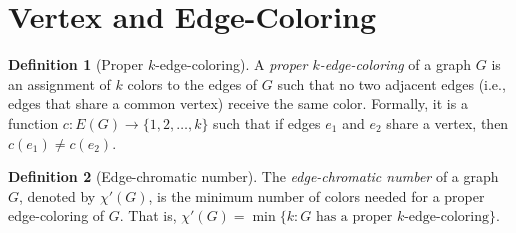 \documentclass{article}
\theoremstyle{definition}
\newtheorem{definition}{Definition}
\begin{document}
\begin{enumerate}[start=21]
\begin{center}
\end{center}

\end{enumerate}

\pagebreak
\newpage
\clearpage

\section{Vertex and Edge-Coloring}

\begin{definition}[Proper $k$-edge-coloring]
A \emph{proper $k$-edge-coloring} of a graph $G$ is an assignment of $k$ colors to the edges of $G$ such that no two adjacent edges (i.e., edges that share a common vertex) receive the same color. Formally, it is a function $c: E(G) \rightarrow \{1,2,\ldots,k\}$ such that if edges $e_1$ and $e_2$ share a vertex, then $c(e_1) \neq c(e_2)$.
\end{definition}

\begin{definition}[Edge-chromatic number]
The \emph{edge-chromatic number} of a graph $G$, denoted by $\chi'(G)$, is the minimum number of colors needed for a proper edge-coloring of $G$. That is, $\chi'(G) = \min\{k : G \text{ has a proper $k$-edge-coloring}\}$.
\end{definition}
\end{document}

